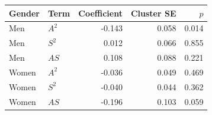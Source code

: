 \begin{tabular}{llrrr}
\toprule
Gender & Term & Coefficient & Cluster SE & $p$ \\
\midrule
Men & $A^2$ & -0.143 & 0.058 & 0.014 \\
Men & $S^2$ & 0.012 & 0.066 & 0.855 \\
Men & $A S$ & 0.108 & 0.088 & 0.221 \\
Women & $A^2$ & -0.036 & 0.049 & 0.469 \\
Women & $S^2$ & -0.040 & 0.044 & 0.362 \\
Women & $A S$ & -0.196 & 0.103 & 0.059 \\
\bottomrule
\end{tabular}
